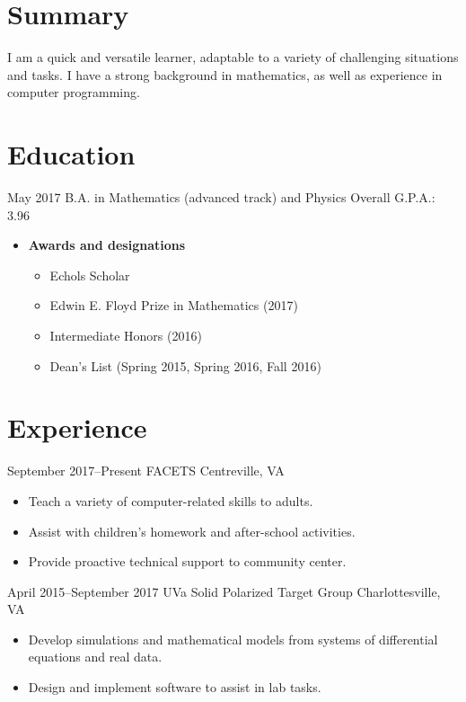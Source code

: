 \documentclass[10pt]{article}
\begin{document}


\section*{Summary}
I am a quick and versatile learner, adaptable to a variety of
challenging situations and tasks. I have a strong background in
mathematics, as well as experience in computer programming.

\section*{Education}
{May 2017}
{B.A. in Mathematics (advanced track) and Physics}
{Overall G.P.A.: 3.96}
\begin{itemize}
\item \textbf{Awards and designations}
  \begin{itemize}
  \item Echols Scholar
  \item Edwin E. Floyd Prize in Mathematics (2017)
  \item Intermediate Honors (2016)
  \item Dean's List (Spring 2015, Spring 2016, Fall 2016)
  \end{itemize}
\end{itemize}

\section*{Experience}
{September 2017--Present}
{FACETS}
{Centreville, VA}
\begin{itemize}
\item Teach a variety of computer-related skills to adults.
\item Assist with children's homework and after-school activities.
\item Provide proactive technical support to community center.
\end{itemize}

{April 2015--September 2017}
{UVa Solid Polarized Target Group}
{Charlottesville, VA}
\begin{itemize}
\item Develop simulations and mathematical models from systems of differential
  equations and real data.
\item Design and implement software to assist in lab tasks.
\end{itemize}
\end{document}
